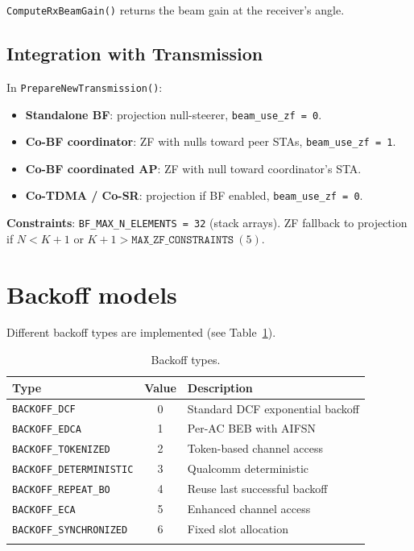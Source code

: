 \documentclass[11pt,a4paper]{article}
\begin{document}
\texttt{ComputeRxBeamGain()} returns the beam gain at the receiver's angle.

\subsection{Integration with Transmission}

In \texttt{PrepareNewTransmission()}:
\begin{itemize}[nosep]
  \item \textbf{Standalone BF}: projection null-steerer, \texttt{beam\_use\_zf = 0}.
  \item \textbf{Co-BF coordinator}: ZF with nulls toward peer STAs, \texttt{beam\_use\_zf = 1}.
  \item \textbf{Co-BF coordinated AP}: ZF with null toward coordinator's STA.
  \item \textbf{Co-TDMA / Co-SR}: projection if BF enabled, \texttt{beam\_use\_zf = 0}.
\end{itemize}

\textbf{Constraints}: \texttt{BF\_MAX\_N\_ELEMENTS = 32} (stack arrays).  ZF fallback to projection if $N < K+1$ or $K+1 > \texttt{MAX\_ZF\_CONSTRAINTS}\ (5)$.

\section{Backoff models}
\label{sec:backoff}

Different backoff types are implemented (see Table~\ref{tab:backoff_types}).

\begin{longtable}{l c l}
\toprule
\textbf{Type} & \textbf{Value} & \textbf{Description} \\
\midrule
\texttt{BACKOFF\_DCF}         & 0 & Standard DCF exponential backoff \\
\texttt{BACKOFF\_EDCA}        & 1 & Per-AC BEB with AIFSN \\
\texttt{BACKOFF\_TOKENIZED}   & 2 & Token-based channel access \\
\texttt{BACKOFF\_DETERMINISTIC} & 3 & Qualcomm deterministic \\
\texttt{BACKOFF\_REPEAT\_BO}  & 4 & Reuse last successful backoff \\
\texttt{BACKOFF\_ECA}         & 5 & Enhanced channel access \\
\texttt{BACKOFF\_SYNCHRONIZED}& 6 & Fixed slot allocation \\
\bottomrule
\caption{Backoff types.}
\label{tab:backoff_types}
\end{longtable}
\end{document}
